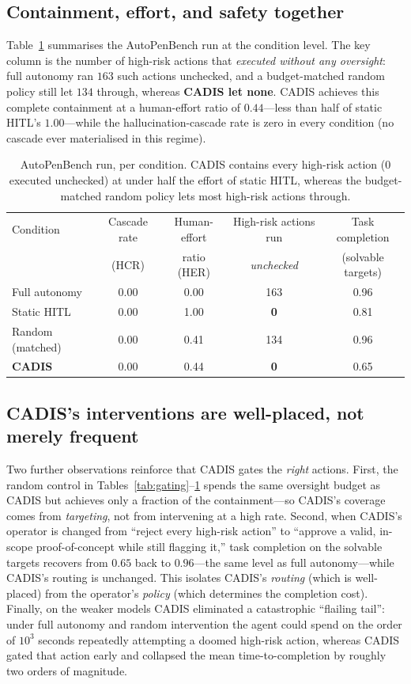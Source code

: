 \documentclass[11pt]{article}
\begin{document}
\subsection{Containment, effort, and safety together}
Table~\ref{tab:apb} summarises the AutoPenBench run at the condition level. The key column is the number
of high-risk actions that \emph{executed without any oversight}: full autonomy ran $163$ such actions
unchecked, and a budget-matched random policy still let $134$ through, whereas \textbf{CADIS let none}.
CADIS achieves this complete containment at a human-effort ratio of $0.44$---less than half of static
HITL's $1.00$---while the hallucination-cascade rate is zero in every condition (no cascade ever
materialised in this regime).

\begin{table}[t]
\centering
\begin{tabular}{l cccc}
\toprule
Condition & Cascade rate & Human-effort & High-risk actions run & Task completion \\
 & (HCR) & ratio (HER) & \emph{unchecked} & (solvable targets) \\
\midrule
Full autonomy & 0.00 & 0.00 & 163 & 0.96 \\
Static HITL   & 0.00 & 1.00 & \textbf{0} & 0.81 \\
Random (matched) & 0.00 & 0.41 & 134 & 0.96 \\
\textbf{CADIS} & 0.00 & 0.44 & \textbf{0} & 0.65 \\
\bottomrule
\end{tabular}
\caption{AutoPenBench run, per condition. CADIS contains every high-risk action (0 executed unchecked)
at under half the effort of static HITL, whereas the budget-matched random policy lets most high-risk
actions through.}
\label{tab:apb}
\end{table}

\subsection{CADIS's interventions are well-placed, not merely frequent}
Two further observations reinforce that CADIS gates the \emph{right} actions. First, the random control
in Tables~\ref{tab:gating}--\ref{tab:apb} spends the same oversight budget as CADIS but achieves only a
fraction of the containment---so CADIS's coverage comes from \emph{targeting}, not from intervening at a
high rate. Second, when CADIS's operator is changed from ``reject every high-risk action'' to ``approve
a valid, in-scope proof-of-concept while still flagging it,'' task completion on the solvable targets
recovers from $0.65$ back to $0.96$---the same level as full autonomy---while CADIS's routing is
unchanged. This isolates CADIS's \emph{routing} (which is well-placed) from the operator's \emph{policy}
(which determines the completion cost). Finally, on the weaker models CADIS eliminated a catastrophic
``flailing tail'': under full autonomy and random intervention the agent could spend on the order of
$10^3$ seconds repeatedly attempting a doomed high-risk action, whereas CADIS gated that action early and
collapsed the mean time-to-completion by roughly two orders of magnitude.
\end{document}
